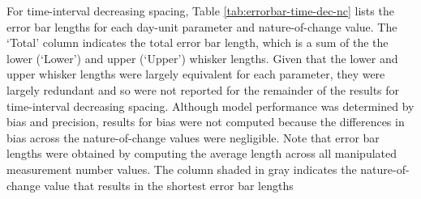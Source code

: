 \documentclass[
12pt, %
twoside,
english]{guelphthesis}
\begin{document}
For time-interval decreasing spacing, Table \ref{tab:errorbar-time-dec-nc} lists the error bar lengths for each day-unit parameter and nature-of-change value. The `Total' column indicates the total error bar length, which is a sum of the the lower (`Lower') and upper (`Upper') whisker lengths. Given that the lower and upper whisker lengths were largely equivalent for each parameter, they were largely redundant and so were not reported for the remainder of the results for time-interval decreasing spacing. Although model performance was determined by bias and precision, results for bias were not computed because the differences in bias across the nature-of-change values were negligible. Note that error bar lengths were obtained by computing the average length across all manipulated measurement number values. The column shaded in gray indicates the nature-of-change value that results in the shortest error bar lengths
\end{document}
